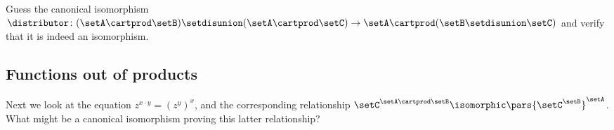 \begin{exercise}\label{ex:distributivity-isomorphism}
Guess the canonical isomorphism $\distributor \colon (\setA \cartprod \setB) \setdisunion (\setA \cartprod \setC) \to \setA \cartprod (\setB \setdisunion \setC)$ and verify that it is indeed an isomorphism. 
\end{exercise}

\begin{solution}
\end{solution}

\subsection{Functions out of products}

Next we look at the equation $z^{x \cdot y} = (z^y)^x$, and the corresponding relationship $ \setC^{\setA \cartprod \setB}  \isomorphic \pars{\setC^\setB}^\setA$. What might be a canonical isomorphism proving this latter relationship?

